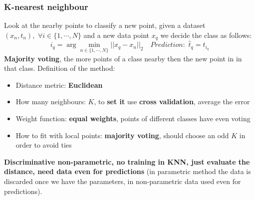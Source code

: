 \subsubsection{K-nearest neighbour}
    Look at the nearby points to classify a new point, given a dataset $(x_n,t_n),\,\,\forall i\in\{1,\cdots,N\}$ and a new data point $x_q$ we decide the class as follows:
    $$i_q=\arg\min_{n\in\{1,\cdots,N\}}||x_q-x_n||_2\hspace{1em}Prediction:\,\,\hat{t}_q=t_{i_q}$$
    \textbf{Majority voting}, the more points of a class nearby then the new point in in that class. Definition of the method:
    \begin{itemize}
        \item Distance metric: \textbf{Euclidean}
        \item How many neighbours: $K$, to \textbf{set it} use \textbf{cross validation}, average the error
        \item Weight function: \textbf{equal weights}, points of different classes have even voting
        \item How to fit with local points: \textbf{majority voting}, should choose an odd $K$ in order to avoid ties
    \end{itemize}
    \textbf{Discriminative non-parametric, no training in KNN, just evaluate the distance, need data even for predictions} (in parametric method the data is discarded once we have the parameters, in non-parametric data used even for predictions).

